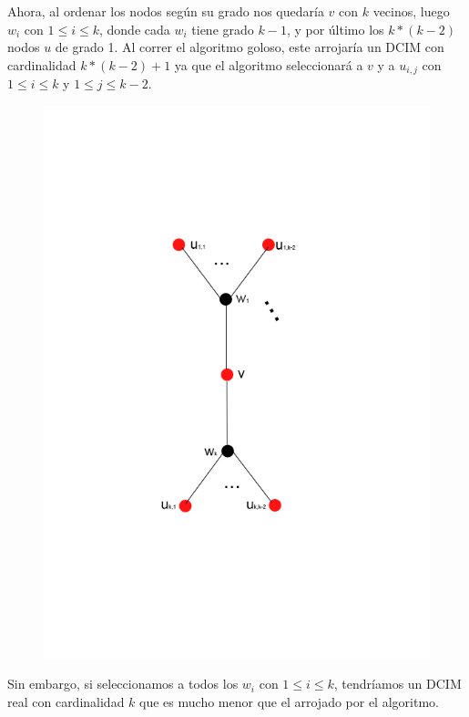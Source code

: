  Ahora, al ordenar los nodos según su grado nos quedaría $v$ con $k$ vecinos, luego $w_i$ con $1 \leq i \leq k$, donde cada $w_i$ tiene grado $k-1$, y por último los $k * (k-2)$ nodos $u$ de grado 1. Al correr el algoritmo goloso, este arrojaría un DCIM con cardinalidad $k * (k-2) + 1$ ya que el algoritmo seleccionará a $v$ y a $u_{i,j}$ con $1 \leq i \leq k$ y $1 \leq j \leq k-2$. \\ 

\begin{figure}[h]
\begin{center}
\includegraphics[scale=0.5]{imagenes/grafos-ej3-tp3-2.png}
\end{center}
\end{figure}


 Sin embargo, si seleccionamos a todos los  $w_i$ con $1 \leq i \leq k$, tendríamos un DCIM real con cardinalidad $k$ que es mucho menor que el arrojado por el algoritmo.

